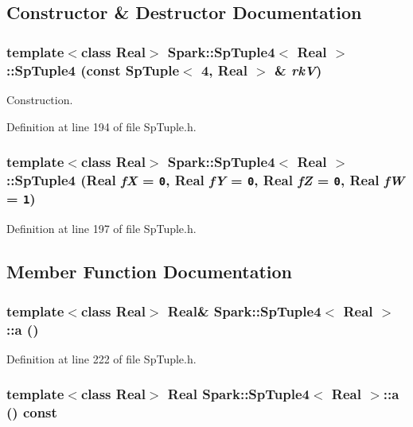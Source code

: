 \subsection{Constructor \& Destructor Documentation}
\subsubsection{\setlength{\rightskip}{0pt plus 5cm}template$<$class Real$>$ {\bf Spark::Sp\-Tuple4}$<$ Real $>$::{\bf Sp\-Tuple4} (const {\bf Sp\-Tuple}$<$ 4, Real $>$ \& {\em rk\-V})\hspace{0.3cm}{\tt  [inline]}}\label{classSpark_1_1SpTuple4_a0}


Construction. 

Definition at line 194 of file Sp\-Tuple.h.
\subsubsection{\setlength{\rightskip}{0pt plus 5cm}template$<$class Real$>$ {\bf Spark::Sp\-Tuple4}$<$ Real $>$::{\bf Sp\-Tuple4} (Real {\em f\-X} = {\tt 0}, Real {\em f\-Y} = {\tt 0}, Real {\em f\-Z} = {\tt 0}, Real {\em f\-W} = {\tt 1})\hspace{0.3cm}{\tt  [inline]}}\label{classSpark_1_1SpTuple4_a1}


Definition at line 197 of file Sp\-Tuple.h.

\subsection{Member Function Documentation}
\subsubsection{\setlength{\rightskip}{0pt plus 5cm}template$<$class Real$>$ Real\& {\bf Spark::Sp\-Tuple4}$<$ Real $>$::a ()\hspace{0.3cm}{\tt  [inline]}}\label{classSpark_1_1SpTuple4_a17}


Definition at line 222 of file Sp\-Tuple.h.
\subsubsection{\setlength{\rightskip}{0pt plus 5cm}template$<$class Real$>$ Real {\bf Spark::Sp\-Tuple4}$<$ Real $>$::a () const\hspace{0.3cm}{\tt  [inline]}}\label{classSpark_1_1SpTuple4_a16}


